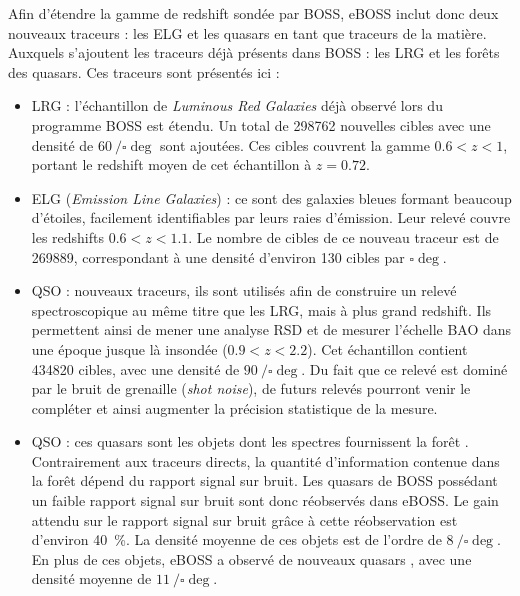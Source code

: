 Afin d'étendre la gamme de redshift sondée par BOSS, eBOSS inclut donc deux nouveaux traceurs : les ELG et les quasars en tant que traceurs de la matière. Auxquels s'ajoutent les traceurs déjà présents dans BOSS : les LRG et les forêts \lya{} des quasars. Ces traceurs sont présentés ici :
\begin{itemize}
  \item LRG : l'échantillon de \emph{Luminous Red Galaxies} déjà observé lors du programme BOSS est étendu. Un total de \num{298762} nouvelles cibles avec une densité de $\SI{60}{\per\square\deg}$ sont ajoutées. Ces cibles couvrent la gamme $\num{0,6} < z < \num{1}$, portant le redshift moyen de cet échantillon à $z = \num{0.72}$.
  \item ELG (\emph{Emission Line Galaxies}) : ce sont des galaxies bleues formant beaucoup d'étoiles, facilement identifiables par leurs raies d'émission. Leur relevé couvre les redshifts $\num{0,6} < z < \num{1,1}$. Le nombre de cibles de ce nouveau traceur est de \num{269889}, correspondant à une densité d'environ \num{130} cibles par $\si{\square\deg}$.
  \item QSO : nouveaux traceurs, ils sont utilisés afin de construire un relevé spectroscopique au même titre que les LRG, mais à plus grand redshift. Ils permettent ainsi de mener une analyse RSD et de mesurer l'échelle BAO dans une époque jusque là insondée ($\num{0,9} < z < \num{2,2}$).
    Cet échantillon contient \num{434820} cibles, avec une densité de $\SI{90}{\per\square\deg}$. Du fait que ce relevé est dominé par le bruit de grenaille (\emph{shot noise}), de futurs relevés pourront venir le compléter et ainsi augmenter la précision statistique de la mesure.
  \item \lya{} QSO : ces quasars sont les objets dont les spectres fournissent la forêt \lya{}. Contrairement aux traceurs directs, la quantité d'information contenue dans la forêt \lya{} dépend du rapport signal sur bruit. Les quasars \lya{} de BOSS possédant un faible rapport signal sur bruit sont donc réobservés dans eBOSS. Le gain attendu sur le rapport signal sur bruit grâce à cette réobservation est d'environ \SI{40}{\percent}. La densité moyenne de ces objets est de l'ordre de $\SI{8}{\per\square\deg}$.
  En plus de ces objets, eBOSS a observé de nouveaux quasars \lya{}, avec une densité moyenne de $\SI{11}{\per\square\deg}$.
\end{itemize}
